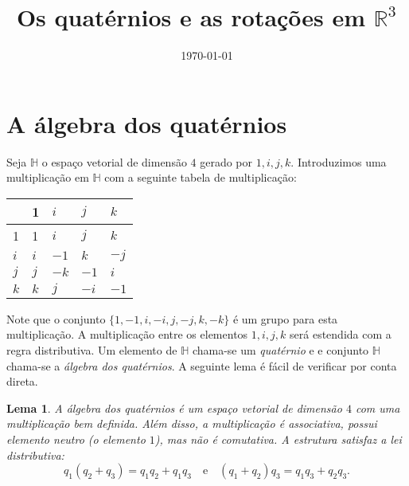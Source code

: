 \documentclass[12pt]{amsart}
\newcommand{\Ha}{\mathbb H}
\newcommand{\R}{\mathbb R}
\newtheorem{lemma}[theorem]{Lema}
\theoremstyle{definition}
\begin{document}
\date{\today}
\title[Quatérnios]{Os quatérnios e as rotações em $\R^3$}
\maketitle


\section{A álgebra dos quatérnios}

Seja $\Ha$ o espaço vetorial de dimensão $4$ gerado por $1,i,j,k$. Introduzimos uma multiplicação em $\Ha$ com a seguinte tabela de multiplicação:

\begin{center}
        \begin{tabular}{|l||l|l|l|l|}
        \hline
            & 1   & $i$  & $j$  & $k$  \\ \hline\hline
        1   & 1   & $i$  & $j$  & $k$  \\ \hline
        $i$ & $i$ & $-1$ & $k$  & $-j$ \\ \hline
        $j$ & $j$ & $-k$ & $-1$ & $i$  \\ \hline
        $k$ & $k$ & $j$  & $-i$ & $-1$ \\ \hline
        \end{tabular}
\end{center}
Note que o conjunto $\{1,-1,i,-i,j,-j,k,-k\}$ é um grupo para esta multiplicação. 
A multiplicação entre os elementos $1,i,j,k$ será estendida com a regra distributiva. Um elemento de $\Ha$ chama-se um \emph{quatérnio} e e conjunto $\Ha$ chama-se a \emph{álgebra dos quatérnios}. A seguinte lema é fácil de verificar por conta direta.

\begin{lemma}
    A álgebra dos quatérnios é um espaço vetorial de dimensão $4$ com uma multiplicação bem definida. Além disso, a multiplicação é associativa, possui elemento neutro (o elemento $1$), mas não é comutativa. A estrutura satisfaz a lei distributiva:
    \[
        q_1(q_2+q_3)=q_1q_2+q_1q_3\quad\mbox{e}\quad(q_1+q_2)q_3=q_1q_3+q_2q_3.
    \]
\end{lemma}
\end{document}
